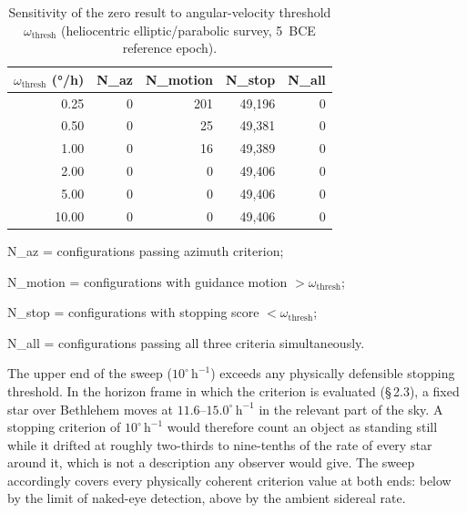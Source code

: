 \documentclass[11pt,a4paper]{article}
\begin{document}
\begin{table}[h]
  \centering
  \begin{threeparttable}
  \caption{Sensitivity of the zero result to angular-velocity threshold
  $\omega_\mathrm{thresh}$ (heliocentric elliptic/parabolic survey, 5~BCE
  reference epoch).}
  \label{tab:sensitivity}
  
  \begin{tabular}{@{}rrrrr@{}}
    \toprule
    $\omega_\mathrm{thresh}$ (°/h) & N\_az & N\_motion & N\_stop & N\_all \\
    \midrule
    0.25 &  0 &   201 & 49,196 & 0 \\
    0.50 &  0 &    25 & 49,381 & 0 \\
    1.00 &  0 &    16 & 49,389 & 0 \\
    2.00 &  0 &     0 & 49,406 & 0 \\
    5.00 &  0 &     0 & 49,406 & 0 \\
   10.00 &  0 &     0 & 49,406 & 0 \\
    \bottomrule
  \end{tabular}
  \begin{tablenotes}
    \footnotesize
    \item N\_az = configurations passing azimuth criterion;
    \item N\_motion = configurations with guidance motion $> \omega_\mathrm{thresh}$;
    \item N\_stop = configurations with stopping score $< \omega_\mathrm{thresh}$;
    \item N\_all = configurations passing all three criteria simultaneously.
    \item The upper end of the sweep ($10^\circ\,\mathrm{h}^{-1}$) exceeds any physically defensible stopping threshold. In the horizon frame in which the criterion is evaluated (§\,2.3), a fixed star over Bethlehem moves at $11.6$--$15.0^\circ\,\mathrm{h}^{-1}$ in the relevant part of the sky. A stopping criterion of $10^\circ\,\mathrm{h}^{-1}$ would therefore count an object as standing still while it drifted at roughly two-thirds to nine-tenths of the rate of every star around it, which is not a description any observer would give. The sweep accordingly covers every physically coherent criterion value at both ends: below by the limit of naked-eye detection, above by the ambient sidereal rate.
  \end{tablenotes}
  \end{threeparttable}
\end{table}
\end{document}
